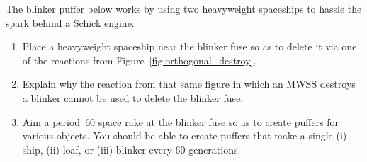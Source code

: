\begin{multicols}{2}
	
	\mfilbreak
	
	
	\begin{problem}\label{exer:schick_engine_blinker_puffer} 
		The blinker puffer below works by using two heavyweight spaceships to hassle the spark behind a Schick engine.
		
		\begin{center}
		\end{center}
		
		\begin{enumerate}[label=\bf\color{ocre}(\alph*)]
			\item Place a heavyweight spaceship near the blinker fuse so as to delete it via one of the reactions from Figure~\ref{fig:orthogonal_destroy}.
			
			\item Explain why the reaction from that same figure in which an MWSS destroys a blinker cannot be used to delete the blinker fuse.
			
			\item Aim a period~$60$ space rake at the blinker fuse so as to create puffers for various objects. You should be able to create puffers that make a single (i) ship, (ii) loaf, or (iii) blinker every $60$ generations.
		\end{enumerate}
	\end{problem}
	
	
	
	
	
	
	
	
	
\end{multicols}
\normalsize\vspace*{0.01cm}
